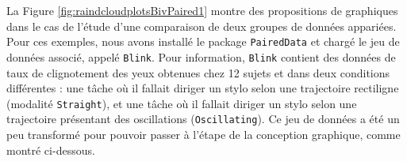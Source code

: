 \documentclass[
  french,
]{book}
\newenvironment{Shaded}{\begin{snugshade}}{\end{snugshade}}
\newcommand{\CommentTok}[1]{\textcolor[rgb]{0.56,0.35,0.01}{\textit{#1}}}
\newcommand{\DataTypeTok}[1]{\textcolor[rgb]{0.13,0.29,0.53}{#1}}
\newcommand{\KeywordTok}[1]{\textcolor[rgb]{0.13,0.29,0.53}{\textbf{#1}}}
\newcommand{\NormalTok}[1]{#1}
\newcommand{\OperatorTok}[1]{\textcolor[rgb]{0.81,0.36,0.00}{\textbf{#1}}}
\newcommand{\StringTok}[1]{\textcolor[rgb]{0.31,0.60,0.02}{#1}}
\begin{document}
La Figure \ref{fig:raindcloudplotsBivPaired1} montre des propositions de graphiques dans le cas de l'étude d'une comparaison de deux groupes de données appariées. Pour ces exemples, nous avons installé le package \texttt{PairedData} et chargé le jeu de données associé, appelé \texttt{Blink}. Pour information, \texttt{Blink} contient des données de taux de clignotement des yeux obtenues chez 12 sujets et dans deux conditions différentes : une tâche où il fallait diriger un stylo selon une trajectoire rectiligne (modalité \texttt{Straight}), et une tâche où il fallait diriger un stylo selon une trajectoire présentant des oscillations (\texttt{Oscillating}). Ce jeu de données a été un peu transformé pour pouvoir passer à l'étape de la conception graphique, comme montré ci-dessous.

\begin{Shaded}
\end{Shaded}
\end{document}
